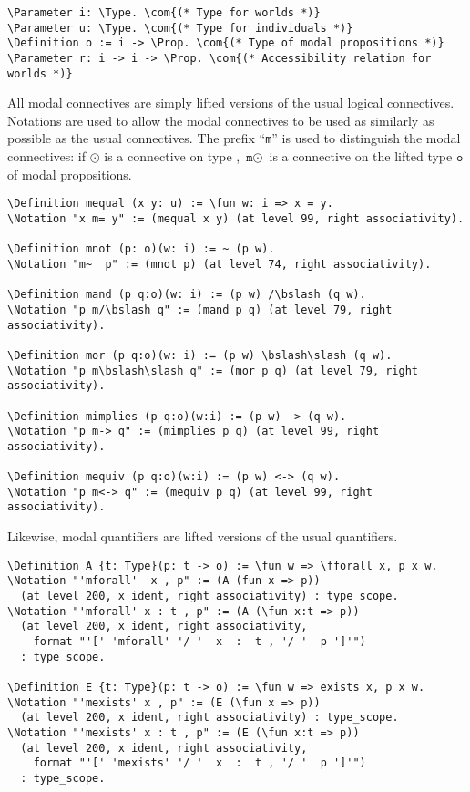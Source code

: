 \documentclass{llncs}
\newcommand{\red}[1]{\textcolor[rgb]{1,0,0}{#1}}
\newcommand{\blue}[1]{\textcolor[rgb]{0,0,1}{#1}}
\newcommand{\brown}[1]{\textcolor[rgb]{0.8,0.6,0.4}{#1}}
\newcommand{\Parameter}{\red{Parameter}}
\newcommand{\Definition}{\red{Definition}}
\newcommand{\Notation}{\blue{Notation}}
\newcommand{\Prop}{\blue{Prop}}
\newcommand{\Type}{\blue{Type}}
\newcommand{\fforall}{\blue{forall}}
\newcommand{\fun}{\blue{fun}}
\newcommand{\com}[1]{\brown{#1}}
\newcommand{\bslash}{\symbol{92}}
\begin{document}
\begin{small}
\begin{Verbatim}[commandchars=\\\{\},fontsize=\verbsize]
\Parameter i: \Type. \com{(* Type for worlds *)}
\Parameter u: \Type. \com{(* Type for individuals *)}
\Definition o := i -> \Prop. \com{(* Type of modal propositions *)}
\Parameter r: i -> i -> \Prop. \com{(* Accessibility relation for worlds *)}
\end{Verbatim}
\end{small}

\noindent
All modal connectives are simply lifted versions of the usual logical connectives. Notations are used to allow the modal connectives to be used as similarly as possible as the usual connectives. The prefix ``\texttt{m}'' is used to distinguish the modal connectives: if $\odot$ is a connective on type , $\texttt{m}\odot$ is a connective on the lifted type $\texttt{o}$ of modal propositions.  

\begin{Verbatim}[commandchars=\\\{\},fontsize=\verbsize]
\Definition mequal (x y: u) := \fun w: i => x = y.
\Notation "x m= y" := (mequal x y) (at level 99, right associativity).

\Definition mnot (p: o)(w: i) := ~ (p w).
\Notation "m~  p" := (mnot p) (at level 74, right associativity).

\Definition mand (p q:o)(w: i) := (p w) /\bslash (q w).
\Notation "p m/\bslash q" := (mand p q) (at level 79, right associativity).

\Definition mor (p q:o)(w: i) := (p w) \bslash\slash (q w).
\Notation "p m\bslash\slash q" := (mor p q) (at level 79, right associativity).

\Definition mimplies (p q:o)(w:i) := (p w) -> (q w).
\Notation "p m-> q" := (mimplies p q) (at level 99, right associativity).

\Definition mequiv (p q:o)(w:i) := (p w) <-> (q w).
\Notation "p m<-> q" := (mequiv p q) (at level 99, right associativity).
\end{Verbatim}

\noindent
Likewise, modal quantifiers are lifted versions of the usual quantifiers.

\begin{Verbatim}[commandchars=\\\{\},fontsize=\verbsize]
\Definition A {t: Type}(p: t -> o) := \fun w => \fforall x, p x w.
\Notation "'mforall'  x , p" := (A (fun x => p))
  (at level 200, x ident, right associativity) : type_scope.
\Notation "'mforall' x : t , p" := (A (\fun x:t => p))
  (at level 200, x ident, right associativity, 
    format "'[' 'mforall' '/ '  x  :  t , '/ '  p ']'")
  : type_scope.

\Definition E {t: Type}(p: t -> o) := \fun w => exists x, p x w.
\Notation "'mexists' x , p" := (E (\fun x => p))
  (at level 200, x ident, right associativity) : type_scope.
\Notation "'mexists' x : t , p" := (E (\fun x:t => p))
  (at level 200, x ident, right associativity, 
    format "'[' 'mexists' '/ '  x  :  t , '/ '  p ']'")
  : type_scope.
\end{Verbatim}
\end{document}
